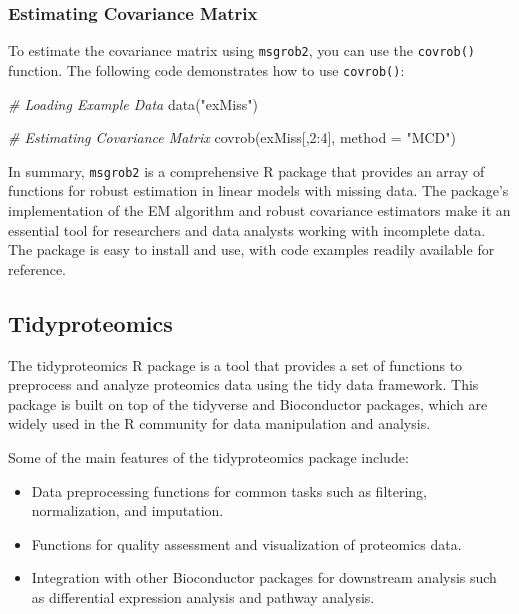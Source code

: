 \documentclass[
]{book}
\newenvironment{Shaded}{\begin{snugshade}}{\end{snugshade}}
\newcommand{\AttributeTok}[1]{\textcolor[rgb]{0.77,0.63,0.00}{#1}}
\newcommand{\CommentTok}[1]{\textcolor[rgb]{0.56,0.35,0.01}{\textit{#1}}}
\newcommand{\DecValTok}[1]{\textcolor[rgb]{0.00,0.00,0.81}{#1}}
\newcommand{\FunctionTok}[1]{\textcolor[rgb]{0.00,0.00,0.00}{#1}}
\newcommand{\NormalTok}[1]{#1}
\newcommand{\SpecialCharTok}[1]{\textcolor[rgb]{0.00,0.00,0.00}{#1}}
\newcommand{\StringTok}[1]{\textcolor[rgb]{0.31,0.60,0.02}{#1}}
\providecommand{\tightlist}{%
  \setlength{\itemsep}{0pt}\setlength{\parskip}{0pt}}
\begin{document}
\hypertarget{estimating-covariance-matrix}{%
\subsubsection*{Estimating Covariance Matrix}\label{estimating-covariance-matrix}}

To estimate the covariance matrix using \texttt{msgrob2}, you can use the \texttt{covrob()} function. The following code demonstrates how to use \texttt{covrob()}:

\begin{Shaded}
\begin{Highlighting}[]
\CommentTok{\# Loading Example Data}
\FunctionTok{data}\NormalTok{(}\StringTok{"exMiss"}\NormalTok{)}

\CommentTok{\# Estimating Covariance Matrix}
\FunctionTok{covrob}\NormalTok{(exMiss[,}\DecValTok{2}\SpecialCharTok{:}\DecValTok{4}\NormalTok{], }\AttributeTok{method =} \StringTok{"MCD"}\NormalTok{)}
\end{Highlighting}
\end{Shaded}

In summary, \texttt{msgrob2} is a comprehensive R package that provides an array of functions for robust estimation in linear models with missing data. The package's implementation of the EM algorithm and robust covariance estimators make it an essential tool for researchers and data analysts working with incomplete data. The package is easy to install and use, with code examples readily available for reference.

\hypertarget{tidyproteomics}{%
\subsection*{Tidyproteomics}\label{tidyproteomics}}

The tidyproteomics R package is a tool that provides a set of functions to preprocess and analyze proteomics data using the tidy data framework. This package is built on top of the tidyverse and Bioconductor packages, which are widely used in the R community for data manipulation and analysis.

Some of the main features of the tidyproteomics package include:

\begin{itemize}
\tightlist
\item
  Data preprocessing functions for common tasks such as filtering, normalization, and imputation.
\item
  Functions for quality assessment and visualization of proteomics data.
\item
  Integration with other Bioconductor packages for downstream analysis such as differential expression analysis and pathway analysis.
\end{itemize}
\end{document}
